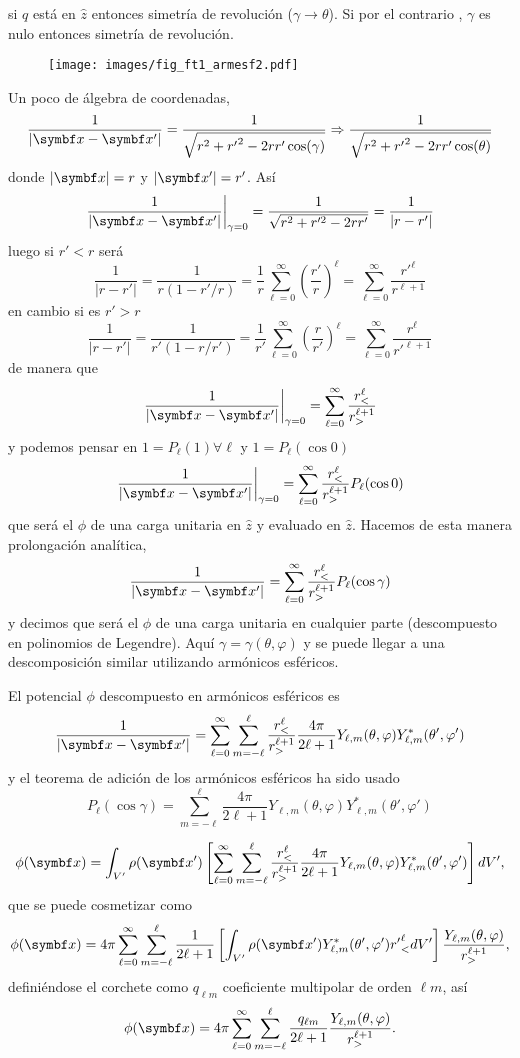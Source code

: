 \documentclass[10pt,oneside]{CBFT_book}
\begin{document}
si $q$ está en $\hat{z}$ entonces simetría de revolución ($\gamma \to \theta$). Si por el contrario ,
$\gamma $ es nulo entonces simetría de revolución.

\begin{figure}[tb]
	\begin{center}
	\texttt{[image: images/fig\_ft1\_armesf2.pdf]}	 
	\end{center}
	\caption{}
\end{figure} 

Un poco de álgebra de coordenadas,
\[
	\frac{1}{|\vb{x}-\vb{x}'|} = \frac{1}{\sqrt{r^2 + {r'}^2  - 2rr'\cos(\gamma)}} \Rightarrow
	\frac{1}{\sqrt{r^2 + {r'}^2  - 2rr'\cos(\theta)}}
\]
donde $|\vb{x}|=r$ y $|\vb{x}'|=r'$. Así
\[
	\left. \frac{1}{|\vb{x}-\vb{x}'|} \right|_{\gamma=0} = \frac{1}{\sqrt{r^2 + r'^2 -2rr'}}=
	\frac{1}{|r-r'|}
\]
luego si $r'<r$ será
\[
	\frac{1}{|r-r'|} = \frac{1}{r(1 - r'/r )} = \frac{1}{r} \sum_{\ell=0}^\infty \left(\frac{r'}{r}\right)^\ell = 
	\sum_{\ell=0}^\infty \frac{r'^\ell}{r^{\ell+1}}
\]
en cambio si es $r'>r$
\[
	\frac{1}{|r-r'|} = \frac{1}{r'(1 - r/r' )} = \frac{1}{r'} \sum_{\ell=0}^\infty \left(\frac{r}{r'}\right)^\ell = 
	\sum_{\ell=0}^\infty \frac{r^\ell}{r'^{\ell+1}}
\]
de manera que
\[
	\left. \frac{1}{|\vb{x}-\vb{x}'|} \right|_{\gamma=0} = \sum_{\ell=0}^\infty  \frac{r_<^\ell}{r_>^{\ell+1}}
\]
y podemos pensar en $1=P_\ell(1) \forall \ell$ y $1=P_\ell(\cos 0)$
\[
	\left. \frac{1}{|\vb{x}-\vb{x}'|} \right|_{\gamma=0} = \sum_{\ell=0}^\infty  \frac{r_<^\ell}{r_>^{\ell+1}}
	P_\ell(\cos 0)
\]
que será el $\phi$ de una carga unitaria en $\hat{z}$ y evaluado en $\hat{z}$.
Hacemos de esta manera prolongación analítica,
\[
	\frac{1}{|\vb{x}-\vb{x}'|}  = \sum_{\ell=0}^\infty  \frac{r_<^\ell}{r_>^{\ell+1}}
	P_\ell(\cos \gamma)
\]
y decimos que será el $\phi$ de una carga unitaria en cualquier parte (descompuesto en polinomios de Legendre).
Aquí $\gamma=\gamma(\theta,\varphi)$ y se puede llegar a una descomposición similar utilizando armónicos esféricos.

El potencial $\phi$ descompuesto en armónicos esféricos es
\[
	\frac{1}{|\vb{x}-\vb{x}'|}  = \sum_{\ell=0}^\infty \sum_{m=-\ell}^\ell \frac{r_<^\ell}{r_>^{\ell+1}}
	\frac{4\pi}{2\ell+1} Y_{\ell,m}(\theta,\varphi) Y_{\ell,m}^*(\theta',\varphi')
\]
y el teorema de adición de los armónicos esféricos ha sido usado
\[
	P_\ell(\cos \gamma) = \sum_{m=-\ell}^\ell \frac{4\pi}{2\ell+1} Y_{\ell,m}(\theta,\varphi) 
	Y_{\ell,m}^*(\theta',\varphi')
\]

\[
	\phi(\vb{x})= \int_{V'} \rho(\vb{x}')\left[ \sum_{\ell=0}^\infty \sum_{m=-\ell}^\ell 
	\frac{r_<^\ell}{r_>^{\ell+1}}\frac{4\pi}{2\ell+1} Y_{\ell,m}(\theta,\varphi) 
	Y_{\ell,m}^*(\theta',\varphi')\right] dV',
\]
que se puede cosmetizar como
\[
	\phi(\vb{x})= 4\pi \sum_{\ell=0}^\infty \sum_{m=-\ell}^\ell \frac{1}{2\ell+1} \left[
	\int_{V'} \rho(\vb{x}') Y_{\ell,m}^*(\theta',\varphi') {r'}_<^\ell dV' \right] 
	\frac{Y_{\ell,m}(\theta,\varphi) }{r_>^{\ell+1}},
\]
definiéndose el corchete como $q_{\ell m}$ coeficiente multipolar de orden $\ell m$, así
\[
	\phi(\vb{x})= 4\pi \sum_{\ell=0}^\infty \sum_{m=-\ell}^\ell \frac{q_{\ell m}}{2\ell+1} 
	\frac{Y_{\ell,m}(\theta,\varphi) }{r_>^{\ell+1}}.
\]
\end{document}
